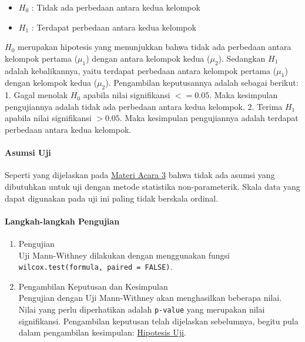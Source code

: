 \documentclass[
]{book}
\providecommand{\tightlist}{%
  \setlength{\itemsep}{0pt}\setlength{\parskip}{0pt}}
\begin{document}
\begin{itemize}
\tightlist
\item
  \(H_0\) : Tidak ada perbedaan antara kedua kelompok
\item
  \(H_1\) : Terdapat perbedaan antara kedua kelompok
\end{itemize}

\(H_0\) merupakan hipotesis yang menunjukkan bahwa tidak ada perbedaan antara kelompok pertama (\(\mu_1\)) dengan antara kelompok kedua (\(\mu_2\)). Sedangkan \(H_1\) adalah kebalikannya, yaitu terdapat perbedaan antara kelompok pertama (\(\mu_1\)) dengan kelompok kedua (\(\mu_2\)). Pengambilan keputusannya adalah sebagai berikut:
1. Gagal menolak \(H_0\) apabila nilai signifikansi \(<= 0.05\). Maka kesimpulan pengujiannya adalah tidak ada perbedaan antara kedua kelompok.
2. Terima \(H_1\) apabila nilai signifikansi \(> 0.05\). Maka kesimpulan pengujiannya adalah terdapat perbedaan antara kedua kelompok.

\hypertarget{asumsi-uji}{%
\paragraph{Asumsi Uji}\label{asumsi-uji}}

Seperti yang dijelaskan pada \protect\hyperlink{a3-materi}{Materi Acara 3} bahwa tidak ada asumsi yang dibutuhkan untuk uji dengan metode statistika non-parameterik. Skala data yang dapat digunakan pada uji ini paling tidak berskala ordinal.

\hypertarget{langkah-langkah-pengujian-1}{%
\paragraph{Langkah-langkah Pengujian}\label{langkah-langkah-pengujian-1}}

\begin{enumerate}
\def\labelenumi{\arabic{enumi}.}
\item
  Pengujian\\
  Uji Mann-Withney dilakukan dengan menggunakan fungsi \texttt{wilcox.test(formula,\ paired\ =\ FALSE)}.
\item
  Pengambilan Keputusan dan Kesimpulan\\
  Pengujian dengan Uji Mann-Withney akan menghasilkan beberapa nilai. Nilai yang perlu diperhatikan adalah \texttt{p-value} yang merupakan nilai signifikansi. Pengambilan keputusan telah dijelaskan sebelumnya, begitu pula dalam pengambilan kesimpulan: \protect\hyperlink{a3-hipotesis-m-bebas}{Hipotesis Uji}.
\end{enumerate}
\end{document}
